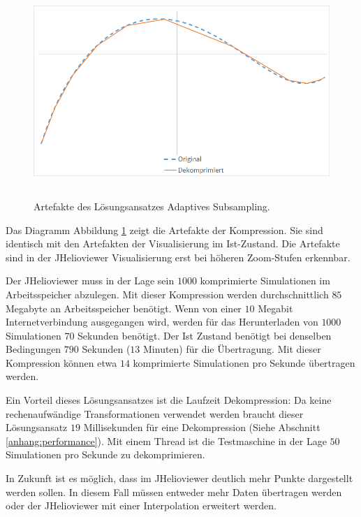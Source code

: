 \begin{figure}[!htbp]
	\center
	\includegraphics[width=1\textwidth,height=8cm,keepaspectratio]{./pictures/resultate/loesung0/loesung0_artefakte.png}
	\caption{Artefakte des Lösungsansatzes Adaptives Subsampling.}
	\label{resultate:loesung0:artefakte}
\end{figure}
Das Diagramm Abbildung \ref{resultate:loesung0:artefakte} zeigt die Artefakte der Kompression. Sie sind identisch mit den Artefakten der Visualisierung im Ist-Zustand. Die Artefakte sind in der JHelioviewer Visualisierung erst bei höheren Zoom-Stufen erkennbar.

Der JHelioviewer muss in der Lage sein $1000$ komprimierte Simulationen im Arbeitsspeicher abzulegen. Mit dieser Kompression werden durchschnittlich $85$ Megabyte an Arbeitsspeicher benötigt. Wenn von einer $10$ Megabit Internetverbindung ausgegangen wird, werden für das Herunterladen von $1000$ Simulationen $70$ Sekunden benötigt. Der Ist Zustand benötigt bei denselben Bedingungen $790$ Sekunden ($13$ Minuten) für die Übertragung. Mit dieser Kompression können etwa $14$ komprimierte Simulationen pro Sekunde übertragen werden. 

Ein Vorteil dieses Lösungsansatzes ist die Laufzeit Dekompression: Da keine rechenaufwändige Transformationen verwendet werden braucht dieser Lösungsansatz $19$ Millisekunden für eine Dekompression (Siehe Abschnitt \ref{anhang:performance}). Mit einem Thread ist die Testmaschine in der Lage $50$ Simulationen pro Sekunde zu dekomprimieren.

In Zukunft ist es möglich, dass im JHelioviewer deutlich mehr Punkte dargestellt werden sollen. In diesem Fall müssen entweder mehr Daten übertragen werden oder der JHelioviewer mit einer Interpolation erweitert werden.